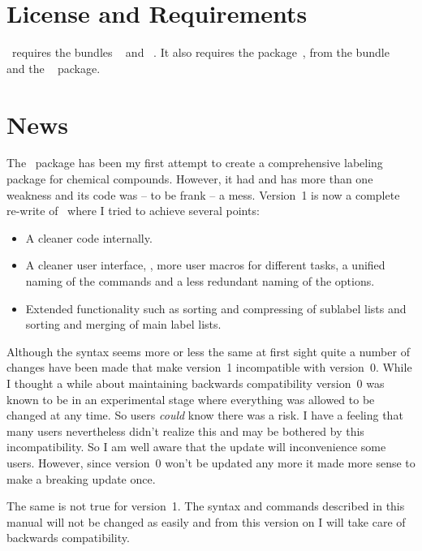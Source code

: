 \documentclass[load-preamble+,babel-options={ngerman,british,american}]{cnltx-doc}
\begin{document}
\section{License and Requirements}\label{sec:license-requirements}
\license

\chemnum\ requires the bundles ~\cite{bnd:l3kernel} and
~\cite{bnd:l3packages}.  It also requires the
 package~\cite{pkg:translations},  from the
 bundle~\cite{bnd:chemmacros} and the
~\cite{pkg:psfrag} package.

\section{News}\label{sec:news}
The \chemnum\ package has been my first attempt to create a comprehensive
labeling package for chemical compounds.  However, it had and has more than
one weakness and its code was -- to be frank -- a mess.  Version~1 is now a
complete re-write of \chemnum\ where I tried to achieve several points:
\begin{itemize}
  \item A cleaner code internally.
  \item A cleaner user interface, \ie, more user macros for different tasks, a
    unified naming of the commands and a less redundant naming of the
    options.
  \item Extended functionality such as sorting and compressing of sublabel
    lists and sorting and merging of main label lists.
\end{itemize}

Although the syntax seems more or less the same at first sight quite a number
of changes have been made that make version~1 incompatible with version~0.
While I thought a while about maintaining backwards compatibility version~0
was known to be in an experimental stage where everything was allowed to be
changed at any time.  So users \emph{could} know there was a risk.  I have a
feeling that many users nevertheless didn't realize this and may be bothered
by this incompatibility.  So I am well aware that the update will
inconvenience some users.  However, since version~0 won't be updated any more
it made more sense to make a breaking update once.

The same is not true for version~1.  The syntax and commands described in this
manual will not be changed as easily and from this version on I will take care
of backwards compatibility.
\end{document}
